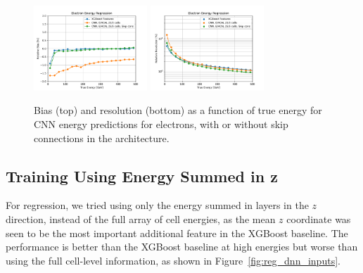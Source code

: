 \begin{figure}[htbp]
\centering
\includegraphics[width=0.38\textwidth]{Images/Calo/bias_vs_E_EleFixed_cnn_skip_zoom.pdf}
\includegraphics[width=0.38\textwidth]{Images/Calo/res_vs_E_EleFixed_cnn_skip_fits.pdf}
\caption{Bias (top) and resolution (bottom) as a function of true energy for CNN energy predictions for electrons, with or without skip connections in the architecture.
}
\label{fig:reg_cnn_skip}
\end{figure}

\subsection*{Training Using Energy Summed in z}

For regression, we tried using only the energy summed in layers in the $z$ direction, instead of the full array of cell energies, as the mean $z$ coordinate was seen to be the most important additional feature in the XGBoost baseline.  The performance is better than the XGBoost baseline at high energies but worse than using the full cell-level information, as shown in Figure~\ref{fig:reg_dnn_inputs}.

